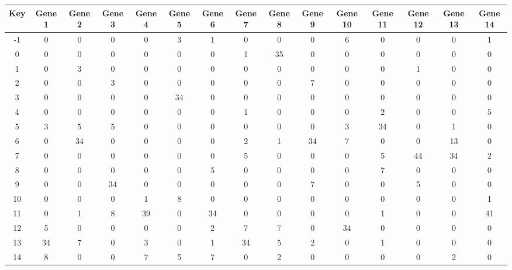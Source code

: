 \begin{tabular}{|c|c|c|c|c|c|c|c|c|c|c|c|c|c|c|}
\hline
Key & Gene 1 & Gene 2 & Gene 3 & Gene 4 & Gene 5 & Gene 6 & Gene 7 & Gene 8 & Gene 9 & Gene 10 & Gene 11 & Gene 12 & Gene 13 & Gene 14 \\
\hline
-1 & 0 & 0 & 0 & 0 & 3 & 1 & 0 & 0 & 0 & 6 & 0 & 0 & 0 & 1 \\
0 & 0 & 0 & 0 & 0 & 0 & 0 & 1 & 35 & 0 & 0 & 0 & 0 & 0 & 0 \\
1 & 0 & 3 & 0 & 0 & 0 & 0 & 0 & 0 & 0 & 0 & 0 & 1 & 0 & 0 \\
2 & 0 & 0 & 3 & 0 & 0 & 0 & 0 & 0 & 7 & 0 & 0 & 0 & 0 & 0 \\
3 & 0 & 0 & 0 & 0 & 34 & 0 & 0 & 0 & 0 & 0 & 0 & 0 & 0 & 0 \\
4 & 0 & 0 & 0 & 0 & 0 & 0 & 1 & 0 & 0 & 0 & 2 & 0 & 0 & 5 \\
5 & 3 & 5 & 5 & 0 & 0 & 0 & 0 & 0 & 0 & 3 & 34 & 0 & 1 & 0 \\
6 & 0 & 34 & 0 & 0 & 0 & 0 & 2 & 1 & 34 & 7 & 0 & 0 & 13 & 0 \\
7 & 0 & 0 & 0 & 0 & 0 & 0 & 5 & 0 & 0 & 0 & 5 & 44 & 34 & 2 \\
8 & 0 & 0 & 0 & 0 & 0 & 5 & 0 & 0 & 0 & 0 & 7 & 0 & 0 & 0 \\
9 & 0 & 0 & 34 & 0 & 0 & 0 & 0 & 0 & 7 & 0 & 0 & 5 & 0 & 0 \\
10 & 0 & 0 & 0 & 1 & 8 & 0 & 0 & 0 & 0 & 0 & 0 & 0 & 0 & 1 \\
11 & 0 & 1 & 8 & 39 & 0 & 34 & 0 & 0 & 0 & 0 & 1 & 0 & 0 & 41 \\
12 & 5 & 0 & 0 & 0 & 0 & 2 & 7 & 7 & 0 & 34 & 0 & 0 & 0 & 0 \\
13 & 34 & 7 & 0 & 3 & 0 & 1 & 34 & 5 & 2 & 0 & 1 & 0 & 0 & 0 \\
14 & 8 & 0 & 0 & 7 & 5 & 7 & 0 & 2 & 0 & 0 & 0 & 0 & 2 & 0 \\
\hline
\end{tabular}